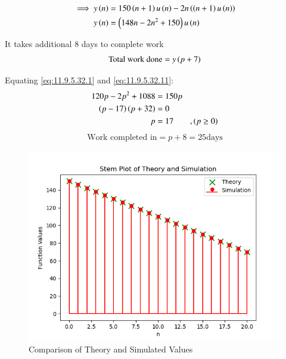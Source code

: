 \documentclass[a4,12pt,twocolumn]{IEEEtran}
\begin{document}
\begin{align}
\implies y\brak{n} &= 150\brak{n+1}u\brak{n} - 2n\brak{\brak{n+1}u\brak{n}}\label{eq:11.9.5.32.9}\\
y\brak{n} &= \brak{148n - 2n^2 + 150}u\brak{n}\label{eq:11.9.5.32.10}
\end{align}

It takes additional 8 days to complete work
\begin{align}
\text{Total work done} = y\brak{p+7}\label{eq:11.9.5.32.11}
\end{align}

Equating \eqref{eq:11.9.5.32.1} and \eqref{eq:11.9.5.32.11}:
\begin{align}
120p - 2p^2 +1088 &= 150p\label{eq:11.9.5.32.12}\\
\brak{p-17}\brak{p+32} &= 0 \label{eq:11.9.5.32.13}\\
p &= 17 \qquad ,\brak{p\geq 0}\label{eq:11.9.5.32.14}
\end{align}
\begin{align}
\text{Work completed in} = p+8= 25 \text{days}\label{eq:11.9.5.32.15}
\end{align}

\begin{figure}[h]
\centering
   \includegraphics[width=1\linewidth]{ncert-maths/11/9/5/32/figs/Theory_vs_Simulation.png}
   \caption{Comparison of Theory and Simulated Values}
   \label{fig: 11.9.5.32.1}
 \end{figure}
\end{document}
